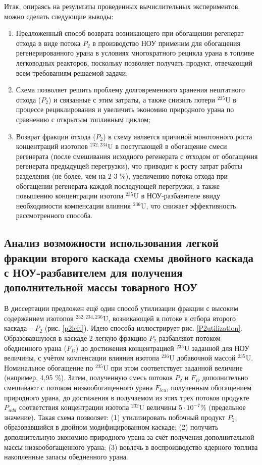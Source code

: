 \newpage

Итак, опираясь на результаты проведенных вычислительных экспериментов, можно сделать следующие выводы:

\begin{enumerate}
    \item Предложенный способ возврата возникающего при обогащении регенерат отхода в виде потока $P_2$ в производство НОУ применим для обогащения регенерированного урана в условиях многократного рецикла урана в топливе легководных реакторов, поскольку позволяет получать продукт, отвечающий всем требованиям решаемой задачи;
    \item Схема позволяет решить проблему долговременного хранения нештатного отхода ($P_2$) и связанные с этим затраты, а также снизить потери $^{235}$U в процессе рециклирования и увеличить экономию природного урана по сравнению с открытым топливным циклом;
    \item Возврат фракции отхода ($P_2$) в схему является причиной монотонного роста концентраций изотопов $^{232,234}$U в поступающей в обогащение смеси регенерата (после смешивания исходного регенерата с отходом от обогащения регенерата предыдущей перегрузки), что приводит к росту затрат работы разделения (не более, чем на 2-3 \%), увеличению потока отхода при обогащении регенерата каждой последующей перегрузки, а также повышению концентрации изотопа $^{235}$U в НОУ-разбавителе ввиду необходимости компенсации влияния $^{236}$U, что снижает эффективность рассмотренного способа.
\end{enumerate}


\subsection{Анализ возможности использования легкой фракции второго каскада схемы двойного каскада с НОУ-разбавителем для получения дополнительной массы товарного НОУ}\label{indep_p2}

В диссертации предложен ещё один способ утилизации фракции с высоким содержанием изотопов $^{232,234,236}$U, возникающей в потоке в отбора второго каскада -- $P_2$ (рис. \ref{p2left}). Идею способа иллюстрирует рис. \ref{P2utilization}. Образовавшуюся в каскаде 2 легкую фракцию $P_2$ разбавляют потоком обедненного урана ($F_D$) до достижения концентрацией $^{235}$U заданной для НОУ величины, с учётом компенсации влияния изотопа $^{236}$U добавочной массой $^{235}$U. Номинальное обогащение по $^{235}$U при этом соответствует заданной величине (например, 4,95 \%). Затем, полученную смесь потоков $P_2$ и $F_D$ дополнительно смешивают с потоком низкообогащенного урана $F_{leu}$, полученным обогащением природного урана, до достижения в получаемом из этих трех потоков продукте $P_{add}$ соответствия концентрации изотопа $^{232}$U величины $5\cdot10^{-7}$\% (предельное значение). Такая схема позволяет: (1) утилизировать побочный продукт $P_2$, образовавшийся в двойном модифицированном каскаде; (2) получить дополнительную экономию природного урана за счёт получения дополнительной массы низкообогащенного урана; (3) вовлечь в воспроизводство ядерного топлива накопленные запасы обедненного урана. 


